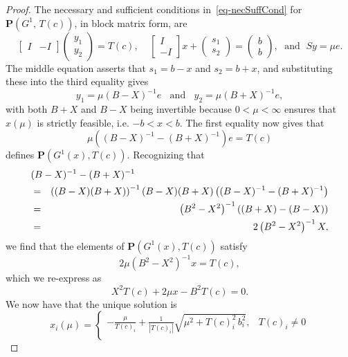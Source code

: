 \documentclass{article}
\def\bP{\mathbf{P}}
\begin{document}
\begin{proof}
The necessary and sufficient conditions in~\eqref{eq-necSuffCond}
for $\bP(G^1, \, T(c) )$, in block matrix form, are
\[
\left[ \begin{array}{cc} I & -I \end{array} \right]
    \left( \begin{array}{c} y_1 \\ y_2 \end{array} \right) = T(c), \;\;\;\;
\left[ \begin{array}{r} I \\ -I \end{array} \right] x +
    \left( \begin{array}{c} s_1 \\ s_2 \end{array} \right) =
    \left( \begin{array}{c} b \\ b \end{array} \right), \;\mbox{ and }\;
Sy = \mu e.
\]
The middle equation asserts that $s_1 = b - x$ and $s_2 = b + x$, and
substituting these into the third equality gives
\[
y_1 = \mu \left( B - X \right)^{-1} e \;\; \mbox{ and } \;\;
    y_2 = \mu \left( B + X \right)^{-1} e,
\]
with both $B+X$ and $B-X$ being invertible because $0 < \mu < \infty$
ensures that $x(\mu)$ is strictly feasible, i.e. $-b < x < b$. The first
equality now gives that 
\[
\mu \left( (B-X)^{-1} - (B+X)^{-1} \right) e = T(c)
\]
defines $\bP(G^1(x), T(c))$. Recognizing that
\begin{eqnarray*}
\lefteqn{(B-X)^{-1} - (B+X)^{-1}} \\ 
   & = & \left((B-X)(B+X)\right)^{-1}(B-X)(B+X) 
            \left((B-X)^{-1} - (B+X)^{-1}\right) \\
   & = & \left(B^2-X^2\right)^{-1}
            \left((B+X) - (B-X)\right) \\
   & = & 2 \left( B^2 - X^2 \right)^{-1} X,
\end{eqnarray*}
we find that the elements of $\bP(G^1(x), T(c))$ satisfy
\[
2\mu \left(B^2 - X^2 \right)^{-1} x = T(c),
\]
which we re-express as
\begin{equation} \label{eq-quadForm}
X^2 T(c) + 2\mu x - B^2 T(c) = 0.
\end{equation}
We now have that the unique solution is
\[
x_i(\mu) = \left\{ \begin{array}{cl}
    \displaystyle
    -\frac{\mu}{T(c)_i} + \frac{1}{|T(c)_i|}\sqrt{ \mu^2 + T(c)_i^2 \, b_i^2 }, & T(c)_i \neq 0 \\[16pt]

\end{array}\]
\end{proof}
\end{document}
